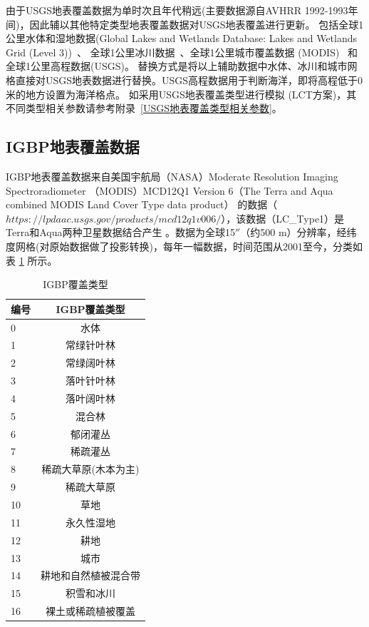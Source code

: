 由于USGS地表覆盖数据为单时次且年代稍远(主要数据源自AVHRR 1992-1993年间)，因此辅以其他特定类型地表覆盖数据对USGS地表覆盖进行更新。
包括全球1公里水体和湿地数据(Global Lakes and Wetlands Database: Lakes and Wetlands Grid (Level 3))~\citep{lehner2004development}、
全球1公里冰川数据~\citep{RGIConsortium2017}、全球1公里城市覆盖数据 (MODIS)~\citep{schneider2009new} 和全球1公里高程数据(USGS)。
替换方式是将以上辅助数据中水体、冰川和城市网格直接对USGS地表数据进行替换。USGS高程数据用于判断海洋，即将高程低于0米的地方设置为海洋格点。
如采用USGS地表覆盖类型进行模拟 (LCT方案)，其不同类型相关参数请参考附录~\ref{USGS地表覆盖类型相关参数}。

\subsection{IGBP地表覆盖数据}\label{IGBP地表覆盖数据}
IGBP地表覆盖数据来自美国宇航局（NASA）Moderate Resolution Imaging Spectroradiometer 
（MODIS）MCD12Q1 Version 6（The Terra and Aqua combined MODIS Land Cover Type data product）
的数据（$https://lpdaac.usgs.gov/products/mcd12q1v006/$），该数据（LC\_Type1）是Terra和Aqua两种卫星数据结合产生 
 \citep{Friedl2019}。数据为全球15$''$（约500 m）分辨率，经纬度网格(对原始数据做了投影转换)，每年一幅数据，时间范围从2001至今，分类如表 \ref{tab:IGBP覆盖类型} 所示。

\begin{table}[]
\centering
\caption{IGBP覆盖类型}
\label{tab:IGBP覆盖类型}
\begin{tabular}{@{}lc@{}}
\toprule
编号 & IGBP覆盖类型     \\ \midrule
0  & 水体           \\
1  & 常绿针叶林           \\
2  & 常绿阔叶林      \\
3  & 落叶针叶林     \\
4  & 落叶阔叶林 \\
5  & 混合林     \\
6  & 郁闭灌丛      \\
7  & 稀疏灌丛           \\
8  & 稀疏大草原(木本为主)         \\
9  & 稀疏大草原     \\
10 & 草地         \\
11 & 永久性湿地        \\
12 & 耕地        \\
13 & 城市        \\
14 & 耕地和自然植被混合带        \\
15 & 积雪和冰川        \\
16 & 裸土或稀疏植被覆盖       \\ \bottomrule
\end{tabular}
\end{table}


